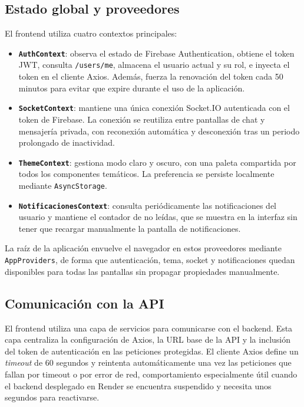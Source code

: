 \subsection{Estado global y proveedores}

El frontend utiliza cuatro contextos principales:

\begin{itemize}
    \item \textbf{\texttt{AuthContext}}: observa el estado de Firebase Authentication, obtiene el token JWT, consulta \texttt{/users/me}, almacena el usuario actual y su rol, e inyecta el token en el cliente Axios. Además, fuerza la renovación del token cada 50 minutos para evitar que expire durante el uso de la aplicación.
    \item \textbf{\texttt{SocketContext}}: mantiene una única conexión Socket.IO autenticada con el token de Firebase. La conexión se reutiliza entre pantallas de chat y mensajería privada, con reconexión automática y desconexión tras un periodo prolongado de inactividad.
    \item \textbf{\texttt{ThemeContext}}: gestiona modo claro y oscuro, con una paleta compartida por todos los componentes temáticos. La preferencia se persiste localmente mediante \texttt{AsyncStorage}.
    \item \textbf{\texttt{NotificacionesContext}}: consulta periódicamente las notificaciones del usuario y mantiene el contador de no leídas, que se muestra en la interfaz sin tener que recargar manualmente la pantalla de notificaciones.
\end{itemize}

La raíz de la aplicación envuelve el navegador en estos proveedores mediante \texttt{AppProviders}, de forma que autenticación, tema, socket y notificaciones quedan disponibles para todas las pantallas sin propagar propiedades manualmente.

\subsection{Comunicación con la API}

El frontend utiliza una capa de servicios para comunicarse con el backend. Esta capa centraliza la configuración de Axios, la URL base de la API y la inclusión del token de autenticación en las peticiones protegidas. El cliente Axios define un \textit{timeout} de 60 segundos y reintenta automáticamente una vez las peticiones que fallan por timeout o por error de red, comportamiento especialmente útil cuando el backend desplegado en Render se encuentra suspendido y necesita unos segundos para reactivarse.

